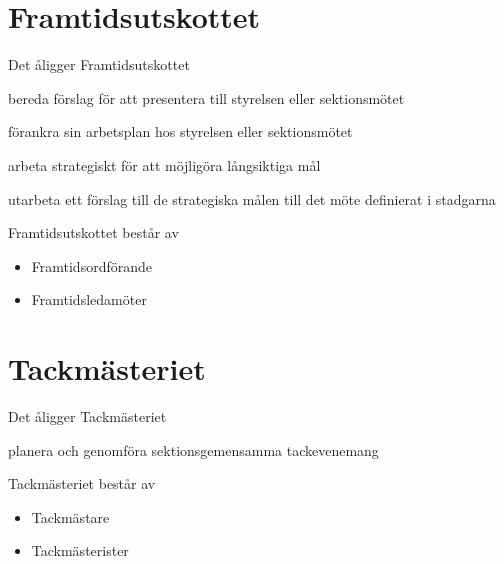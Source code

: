 \documentclass[pdfbookmarks,a4paper,11pt]{article}
\newlength{\itemcollength}
\newenvironment{reglemlista}{%
  \begin{list}{}{%
      \setlength{\labelwidth}{\itemcollength}%
      \setlength{\leftmargin}{\labelwidth + \labelsep}%
      \renewcommand{\makelabel}[1]{%
        \raisebox{0pt}[1ex][0pt]{%
          \makebox[\labelwidth][l]{%
            \parbox[t]{\itemcollength}{%
              \raggedright\hspace{0pt}##1}}}\hfill}%
      }}{%
  \end{list}}
\begin{document}
\section{Framtidsutskottet}

\begin{reglemlista}

	\item[Åligganden]
	Det åligger Framtidsutskottet
	\begin{attlista}
		\item bereda förslag för att presentera till styrelsen eller sektionsmötet
		\item  förankra sin arbetsplan hos styrelsen eller sektionsmötet
		\item arbeta strategiskt för att möjligöra långsiktiga mål
		\item utarbeta ett förslag till de strategiska målen till det möte definierat i stadgarna
	\end{attlista}
	\item[Sammansättning]
	Framtidsutskottet består av
	\begin{itemize}
		\item Framtidsordförande
		\item Framtidsledamöter
	\end{itemize}

\end{reglemlista}

\section{Tackmästeriet}
	\begin{reglemlista}
		\item[Åligganden]
		Det åligger Tackmästeriet
		\begin{attlista}
			\item planera och genomföra sektionsgemensamma tackevenemang
		\end{attlista}
		\item[Sammansättning]
		Tackmästeriet består av
		\begin{itemize}
			\item Tackmästare
			\item Tackmästerister
		\end{itemize}
	\end{reglemlista}
\end{document}
